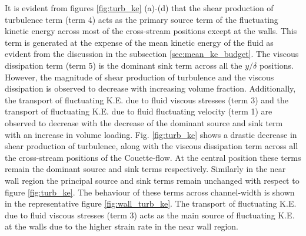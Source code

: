 \documentclass[aip,graphicx]{revtex4-1}
\begin{document}
 It is evident from figures \ref{fig:turb_ke} (a)-(d) that the shear production of turbulence term (term 4) acts as the primary source term of the fluctuating kinetic energy across most of the cross-stream positions except at the walls. This term is generated at the expense of the mean kinetic energy of the fluid as evident from the discussion in the subsection \ref{sec:mean_ke_budget}. The viscous dissipation term (term 5) is the dominant sink term across all the $y/\delta$ positions. However, the magnitude of shear production of turbulence and the viscous dissipation is observed to decrease with increasing volume fraction. Additionally, the transport of fluctuating K.E. due to fluid viscous stresses (term 3) and the transport of fluctuating K.E. due to fluid fluctuating velocity (term 1) are observed to decrease with the decrease of the dominant source and sink term with an increase in volume loading. Fig. \ref{fig:turb_ke} shows a drastic decrease in shear production of turbulence, along with the viscous dissipation term across all the cross-stream positions of the Couette-flow. At the central position these terms remain the dominant source and sink terms respectively. Similarly in the near wall region the principal source and sink terms remain unchanged with respect to figure \ref{fig:turb_ke}. The behaviour of these terms across channel-width is shown in the representative figure \ref{fig:wall_turb_ke}. The transport of fluctuating K.E. due to fluid viscous stresses (term 3) acts as the main source of fluctuating K.E. at the walls due to the higher strain rate in the near wall region.     
\end{document}
